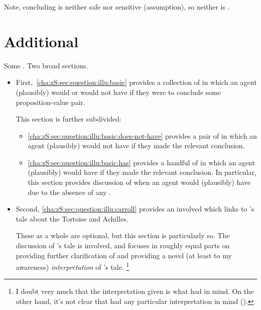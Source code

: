 \begin{note}
  Note, concluding is neither safe nor sensitive (assumption), so neither is \zS{}.
\end{note}

\section{Additional }
\label{cha:zS:sec:question:illu}

\begin{note}
  Some .
  Two broad sections.

  \begin{itemize}
  \item
    First,~\autoref{cha:zS:sec:question:illu:basic} provides a collection of  in which an agent (plausibly) would or would not have \zS{} if they were to conclude some proposition-value pair.

    This section is further subdivided:
    \begin{itemize}
    \item
      \autoref{cha:zS:sec:question:illu:basic:does-not-have} provides a pair of  in which an agent (plausibly) would not have \zS{} if they made the relevant conclusion.
    \item
      \autoref{cha:zS:sec:question:illu:basic:has} provides a handful of  in which an agent (plausibly) would have \zS{} if they made the relevant conclusion.
      In particular, this section provides discussion of when an agent would (plausibly) have \zS{} due to the absence of any .
    \end{itemize}
  \item
    Second, \autoref{cha:zS:sec:question:illu:carroll} provides an involved  which links \qzS{} to \citeauthor{Carroll:1895uj}'s tale about the Tortoise and Achilles.

    These  as a whole are optional, but this section is particularly so.
    The discussion of \citeauthor{Carroll:1895uj}'s tale is involved, and focuses in roughly equal parts on providing further clarification of \zS{} and providing a novel (at least to my awareness) \emph{interpretation} of \citeauthor{Carroll:1895uj}'s tale.%
    \footnote{
      I doubt very much that the interpretation given is what \citeauthor{Carroll:1895uj} had in mind.
      On the other hand, it's not clear that \citeauthor{Carroll:1895uj} had any particular interpretation in mind (\cite[Cf.][]{Thomson:2010tt}).
    }
  \end{itemize}
\end{note}


